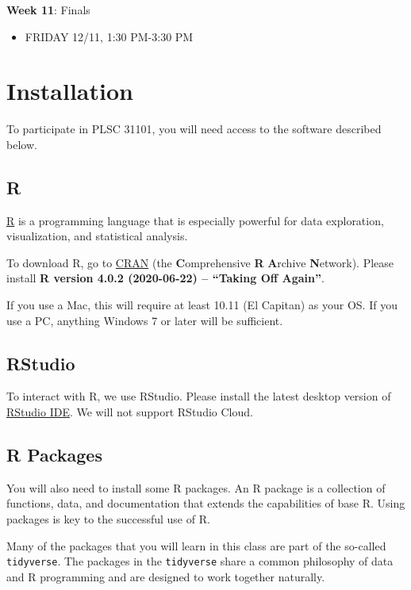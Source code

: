 \documentclass[]{book}
\providecommand{\tightlist}{%
  \setlength{\itemsep}{0pt}\setlength{\parskip}{0pt}}
\begin{document}
\textbf{Week 11}: Finals

\begin{itemize}
\tightlist
\item
  FRIDAY 12/11, 1:30 PM-3:30 PM
\end{itemize}

\chapter{Installation}\label{installation}

To participate in PLSC 31101, you will need access to the software
described below.

\section{R}\label{r}

\href{http://www.r-project.org/}{R} is a programming language that is
especially powerful for data exploration, visualization, and statistical
analysis.

To download R, go to \href{https://cran.r-project.org/}{CRAN} (the
\textbf{C}omprehensive \textbf{R} \textbf{A}rchive \textbf{N}etwork).
Please install \textbf{R version 4.0.2 (2020-06-22) -- ``Taking Off
Again''}.

If you use a Mac, this will require at least 10.11 (El Capitan) as your
OS. If you use a PC, anything Windows 7 or later will be sufficient.

\section{RStudio}\label{rstudio}

To interact with R, we use RStudio. Please install the latest desktop
version of \href{http://www.rstudio.com/ide/download/desktop}{RStudio
IDE}. We will not support RStudio Cloud.

\section{R Packages}\label{r-packages}

You will also need to install some R packages. An R package is a
collection of functions, data, and documentation that extends the
capabilities of base R. Using packages is key to the successful use of
R.

Many of the packages that you will learn in this class are part of the
so-called \texttt{tidyverse}. The packages in the \texttt{tidyverse}
share a common philosophy of data and R programming and are designed to
work together naturally.
\end{document}
